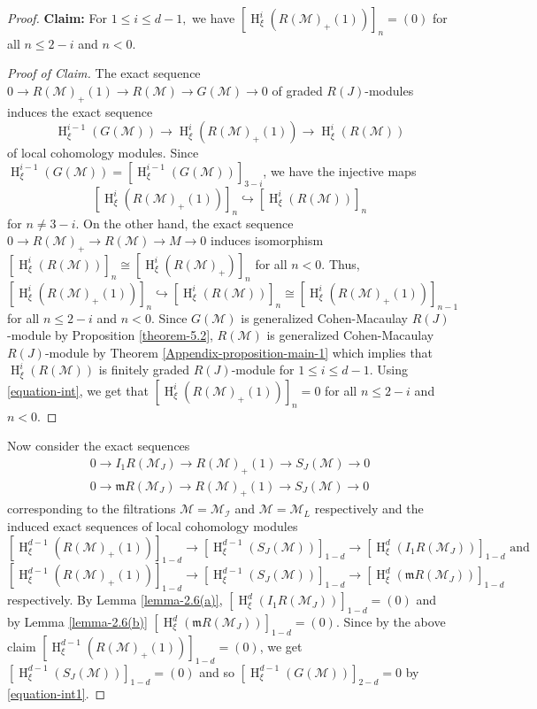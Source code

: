\documentclass[11pt,reqno]{amsart}
\theoremstyle{definition}
\newcommand{\m}{\mathfrak m}
\def\M{{\mathcal M}}
\def\I{{\mathcal I}}
\DeclareMathOperator{\h}{H}
\numberwithin{equation}{section}
\begin{document}
\begin{proof}
{\bf{Claim:}} For $1\leq i\leq d-1,$ we have $[\h^i_{\xi}(R(\M)_+(1))]_n=(0)$ for all $n\leq 2-i$ and $n<0$.
\begin{proof}[Proof of Claim] The exact sequence $0\to R(\M)_+(1)\to R(\M)\to G(\M)\to 0$ of graded $R(J)$-modules induces the exact
	sequence $$ \h^{i-1}_{\xi}(G(\M))\to \h^i_{\xi}(R(\M)_+(1))\to \h^i_{\xi}(R(\M))$$
	of local cohomology modules. Since  $\h^{i-1}_{\xi}(G(\M))=[\h^{i-1}_{\xi}(G(\M))]_{3-i}$, we have the injective maps 
	$$[\h^{i}_{\xi}(R(\M)_+(1))]_n\hookrightarrow [\h^{i}_{\xi}(R(\M))]_n$$  for $n\neq 3-i.$ 
	On the other hand, the exact sequence $0\to R(\M)_+\to R(\M)\to M\to 0$ induces isomorphism $[\h^i_{\xi}(R(\M))]_n\cong [\h^i_{\xi}(R(\M)_+)]_{n}$ for all $n<0$.
	Thus,  \begin{equation}\label{equation-int}
		[\h^{i}_{\xi}(R(\M)_+(1))]_n\hookrightarrow [\h^{i}_{\xi}(R(\M))]_n \cong [\h^i_{\xi}(R(\M)_+(1))]_{n-1} 
	\end{equation}
	for all $n\leq 2-i$ and $n<0.$ Since $G(\M)$ is generalized Cohen-Macaulay $R(J)$-module by Proposition
	\ref{theorem-5.2}, $R(\M)$ is generalized Cohen-Macaulay $R(J)$-module by Theorem \ref{Appendix-proposition-main-1} 
which implies that $\h^i_{\xi}(R(\M))$ is finitely graded $R(J)$-module for $1\leq i\leq d-1$. Using \eqref{equation-int}, 
	we get that $[\h^i_{\xi}(R(\M)_+(1))]_n=0$ for all $n\leq 2-i$ and $n<0$.
\end{proof}
Now consider the exact sequences 
\begin{align}\label{equation:int5(a)}
0\to I_1 R(\M_J)\to R(\M)_+(1)\to S_J(\M)\to 0\\
0\to \m R(\M_J)\to R(\M)_+(1)\to S_J(\M)\to 0 \label{equation:int5(b)}
\end{align} corresponding to the filtrations $\M=\M_\I$ and $\M=\M_L$ respectively and the induced exact sequences of local cohomology modules 
$$[\h^{d-1}_{\xi}(R(\M)_+(1))]_{1-d}\to [\h^{d-1}_{\xi}(S_J(\M))]_{1-d}\to [\h^d_{\xi}(I_1 R(\M_J))]_{1-d} \text{ and }$$
$$
[\h^{d-1}_{\xi}(R(\M)_+(1))]_{1-d}\to [\h^{d-1}_{\xi}(S_J(\M))]_{1-d}\to [\h^d_{\xi}(\m R(\M_J))]_{1-d}
$$
respectively.
By Lemma \ref{lemma-2.6(a)}, $[\h^d_{\xi}(I_1 R(\M_J))]_{1-d}=(0)$ and by Lemma \ref{lemma-2.6(b)} $[\h^d_{\xi}(\m R(\M_J))]_{1-d}=(0)$. Since by the above claim $[\h^{d-1}_{\xi}(R(\M)_+(1))]_{1-d}=(0)$, we get 
$[\h^{d-1}_{\xi}(S_J(\M))]_{1-d}=(0)$ and so $[\h^{d-1}_{\xi}(G(\M))]_{2-d}=0$ by \eqref{equation-int1}.


\end{proof}
\end{document}
